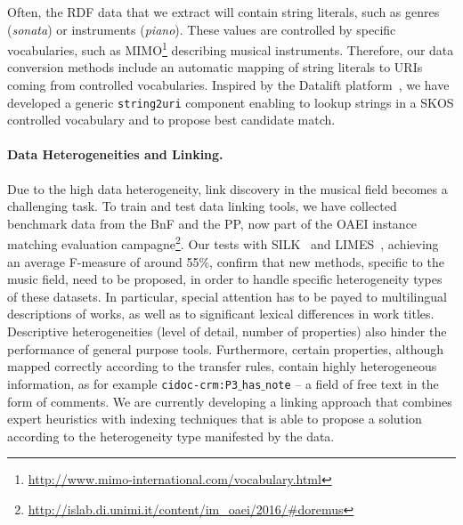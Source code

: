 \documentclass[runningheads,a4paper]{llncs}
\begin{document}
\vspace{-0.5cm}
Often, the RDF data that we extract will contain string literals, such as genres ({\it sonata}) or instruments ({\it piano}). These values are controlled by specific vocabularies, such as MIMO\footnote{\url{http://www.mimo-international.com/vocabulary.html}} describing musical instruments. Therefore, our data conversion methods include an automatic mapping of string literals to URIs coming from controlled vocabularies. Inspired by the Datalift platform~\cite{datalift}, we have developed a generic \texttt{string2uri} component enabling to lookup strings in a SKOS controlled vocabulary and to propose best candidate match.

\paragraph{{\bf Data Heterogeneities and Linking.}} Due to the high data heterogeneity, link discovery in the musical field becomes a challenging task. To train and test data linking tools, we have collected benchmark data from the BnF and the PP, now part of the OAEI instance matching evaluation campagne\footnote{\url{http://islab.di.unimi.it/content/im_oaei/2016/\#doremus}}. Our tests with SILK~\cite{jentzsch2010silk} and LIMES~\cite{ngomo2011limes}, achieving an average F-measure of around 55\%, confirm that new methods, specific to the music field, need to be proposed, in order to handle specific heterogeneity types of these datasets. In particular, special attention has to be payed to multilingual descriptions of works, as well as to significant lexical differences in work titles. Descriptive heterogeneities (level of detail, number of properties) also hinder the performance of general purpose tools. Furthermore, certain properties, although mapped correctly according to the transfer rules, contain highly heterogeneous information, as for example \texttt{cidoc-crm:P3$\_$has$\_$note} -- a field of free text in the form of comments. We are currently developing a linking approach that combines expert heuristics with indexing techniques that is able to propose a solution according to the heterogeneity type manifested by the data.

\end{document}
